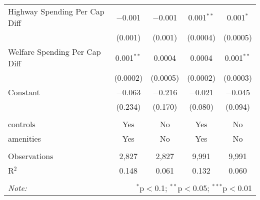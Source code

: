 \begin{table}[!htbp]
\begin{tabular}{@{\extracolsep{5pt}}lcccc}
  Highway Spending Per Cap Diff & $-$0.001 & $-$0.001 & 0.001$^{**}$ & 0.001$^{*}$ \\ 
  & (0.001) & (0.001) & (0.0004) & (0.0005) \\ 
  Welfare Spending Per Cap Diff & 0.001$^{**}$ & 0.0004 & 0.0004 & 0.001$^{**}$ \\ 
  & (0.0002) & (0.0005) & (0.0002) & (0.0003) \\ 
  Constant & $-$0.063 & $-$0.216 & $-$0.021 & $-$0.045 \\ 
  & (0.234) & (0.170) & (0.080) & (0.094) \\ 
 \hline \\[-1.8ex] 
controls & Yes & No & Yes & No \\ 
amenities & Yes & No & Yes & No \\ 
\hline \\[-1.8ex] 
Observations & 2,827 & 2,827 & 9,991 & 9,991 \\ 
R$^{2}$ & 0.148 & 0.061 & 0.132 & 0.060 \\ 
\hline 
\hline \\[-1.8ex] 
\textit{Note:}  & \multicolumn{4}{r}{$^{*}$p$<$0.1; $^{**}$p$<$0.05; $^{***}$p$<$0.01} \\ 
\end{tabular} 
\end{table} 
